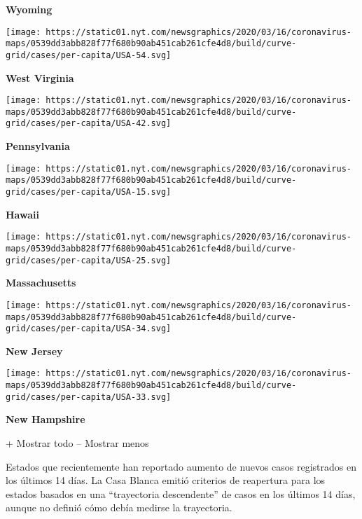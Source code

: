 \textbf{Wyoming}

\href{https://www.nytimes.com/interactive/2020/us/west-virginia-coronavirus-cases.html}{}

\texttt{[image: https://static01.nyt.com/newsgraphics/2020/03/16/coronavirus-maps/0539dd3abb828f77f680b90ab451cab261cfe4d8/build/curve-grid/cases/per-capita/USA-54.svg]}

\textbf{West Virginia}

\href{https://www.nytimes.com/interactive/2020/us/pennsylvania-coronavirus-cases.html}{}

\texttt{[image: https://static01.nyt.com/newsgraphics/2020/03/16/coronavirus-maps/0539dd3abb828f77f680b90ab451cab261cfe4d8/build/curve-grid/cases/per-capita/USA-42.svg]}

\textbf{Pennsylvania}

\href{https://www.nytimes.com/interactive/2020/us/hawaii-coronavirus-cases.html}{}

\texttt{[image: https://static01.nyt.com/newsgraphics/2020/03/16/coronavirus-maps/0539dd3abb828f77f680b90ab451cab261cfe4d8/build/curve-grid/cases/per-capita/USA-15.svg]}

\textbf{Hawaii}

\href{https://www.nytimes.com/interactive/2020/us/massachusetts-coronavirus-cases.html}{}

\texttt{[image: https://static01.nyt.com/newsgraphics/2020/03/16/coronavirus-maps/0539dd3abb828f77f680b90ab451cab261cfe4d8/build/curve-grid/cases/per-capita/USA-25.svg]}

\textbf{Massachusetts}

\href{https://www.nytimes.com/interactive/2020/us/new-jersey-coronavirus-cases.html}{}

\texttt{[image: https://static01.nyt.com/newsgraphics/2020/03/16/coronavirus-maps/0539dd3abb828f77f680b90ab451cab261cfe4d8/build/curve-grid/cases/per-capita/USA-34.svg]}

\textbf{New Jersey}

\href{https://www.nytimes.com/interactive/2020/us/new-hampshire-coronavirus-cases.html}{}

\texttt{[image: https://static01.nyt.com/newsgraphics/2020/03/16/coronavirus-maps/0539dd3abb828f77f680b90ab451cab261cfe4d8/build/curve-grid/cases/per-capita/USA-33.svg]}

\textbf{New Hampshire}

+ Mostrar todo -- Mostrar menos

Estados que recientemente han reportado aumento de nuevos casos
registrados en los últimos 14 días. La Casa Blanca emitió criterios de
reapertura para los estados basados en una ``trayectoria descendente''
de casos en los últimos 14 días, aunque no definió cómo debía medirse la
trayectoria.

